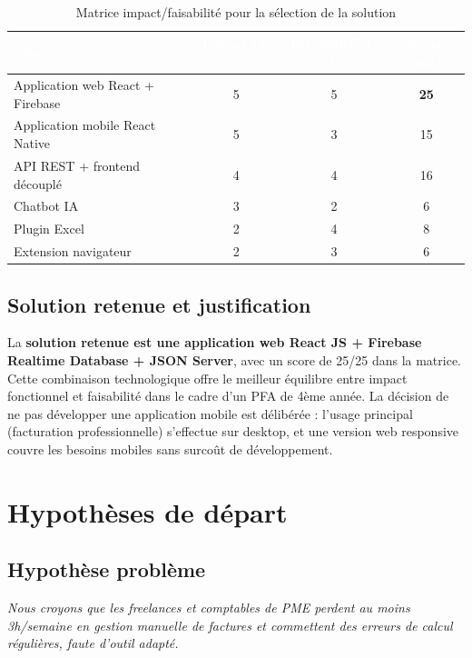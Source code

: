 \documentclass[12pt,a4paper]{report}
\begin{document}
\begin{table}[H]
\centering
\caption{Matrice impact/faisabilité pour la sélection de la solution}
\label{tab:matrice_impact}
\begin{tabular}{|l|c|c|c|}
\hline
\rowcolor{emsiblue}\textcolor{white}{\textbf{Idée}} & \textcolor{white}{\textbf{Impact (1-5)}} & \textcolor{white}{\textbf{Faisabilité (1-5)}} & \textcolor{white}{\textbf{Score total}} \\
\hline
Application web React + Firebase & 5 & 5 & \textbf{25} \\
Application mobile React Native & 5 & 3 & 15 \\
API REST + frontend découplé & 4 & 4 & 16 \\
Chatbot IA & 3 & 2 & 6 \\
Plugin Excel & 2 & 4 & 8 \\
Extension navigateur & 2 & 3 & 6 \\
\hline
\end{tabular}
\end{table}

\subsection{Solution retenue et justification}

La \textbf{solution retenue est une application web React JS + Firebase Realtime Database + JSON Server}, avec un score de 25/25 dans la matrice. Cette combinaison technologique offre le meilleur équilibre entre impact fonctionnel et faisabilité dans le cadre d'un PFA de 4ème année. La décision de ne pas développer une application mobile est délibérée : l'usage principal (facturation professionnelle) s'effectue sur desktop, et une version web responsive couvre les besoins mobiles sans surcoût de développement.

\section{Hypothèses de départ}

\subsection{Hypothèse problème}
\textit{Nous croyons que les freelances et comptables de PME perdent au moins 3h/semaine en gestion manuelle de factures et commettent des erreurs de calcul régulières, faute d'outil adapté.}
\end{document}
